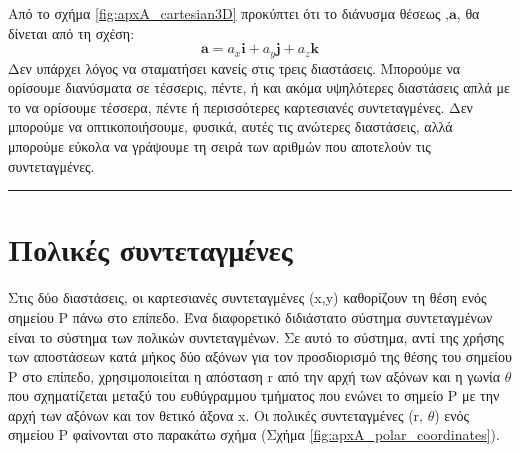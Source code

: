 Από το σχήμα \ref{fig:apxA_cartesian3D} προκύπτει ότι το διάνυσμα θέσεως ,$\boldsymbol{a}$, θα δίνεται από τη σχέση: $$\boldsymbol{a} = a_x \boldsymbol{i} + a_y \boldsymbol{j} + a_z \boldsymbol{k}$$
Δεν υπάρχει λόγος να σταματήσει κανείς στις τρεις διαστάσεις. Μπορούμε να ορίσουμε διανύσματα σε τέσσερις, πέντε, ή και ακόμα υψηλότερες διαστάσεις απλά με το να ορίσουμε τέσσερα, πέντε ή περισσότερες καρτεσιανές συντεταγμένες. Δεν μπορούμε να οπτικοποιήσουμε, φυσικά, αυτές τις ανώτερες διαστάσεις, αλλά μπορούμε εύκολα να γράψουμε τη σειρά των αριθμών που αποτελούν τις συντεταγμένες.\\
{\color{red} \hrule}


\section{Πολικές συντεταγμένες}
Στις δύο διαστάσεις, οι καρτεσιανές συντεταγμένες (x,y) καθορίζουν τη θέση ενός σημείου P πάνω στο επίπεδο. Ένα διαφορετικό διδιάστατο σύστημα συντεταγμένων είναι το σύστημα των πολικών συντεταγμένων. Σε αυτό το σύστημα, αντί της χρήσης των αποστάσεων κατά μήκος δύο αξόνων για τον προσδιορισμό της θέσης του σημείου P στο επίπεδο, χρησιμοποιείται η απόσταση r από την αρχή των αξόνων και η γωνία $\theta$ που σχηματίζεται μεταξύ του ευθύγραμμου τμήματος που ενώνει το σημείο P με την αρχή των αξόνων και τον θετικό άξονα x. Οι πολικές συντεταγμένες (r, $\theta$) ενός σημείου P φαίνονται στο παρακάτω σχήμα (Σχήμα \ref{fig:apxA_polar_coordinates}).

